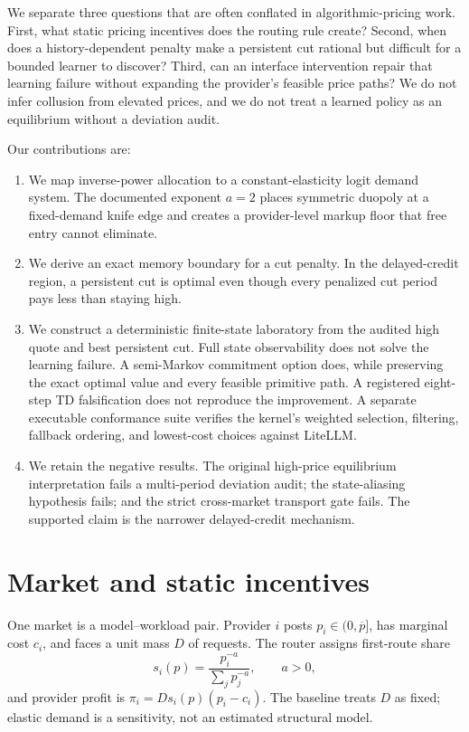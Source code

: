 \documentclass[11pt]{article}
\newcommand{\1}{\mathbf{1}}
\newcommand{\pbar}{\overline p}
\begin{document}
We separate three questions that are often conflated in algorithmic-pricing
work.  First, what static pricing incentives does the routing rule create?
Second, when does a history-dependent penalty make a persistent cut rational
but difficult for a bounded learner to discover?  Third, can an interface
intervention repair that learning failure without expanding the provider's
feasible price paths?  We do not infer collusion from elevated prices, and we
do not treat a learned policy as an equilibrium without a deviation audit.

Our contributions are:
\begin{enumerate}
  \item We map inverse-power allocation to a constant-elasticity logit demand
  system.  The documented exponent $a=2$ places symmetric duopoly at a
  fixed-demand knife edge and creates a provider-level markup floor that free
  entry cannot eliminate.
  \item We derive an exact memory boundary for a cut penalty.  In the
  delayed-credit region, a persistent cut is optimal even though every
  penalized cut period pays less than staying high.
  \item We construct a deterministic finite-state laboratory from the audited
  high quote and best persistent cut.  Full state observability does not solve
  the learning failure.  A semi-Markov commitment option does, while preserving
  the exact optimal value and every feasible primitive path.  A registered
  eight-step TD falsification does not reproduce the improvement.  A separate
  executable conformance suite verifies the kernel's weighted selection,
  filtering, fallback ordering, and lowest-cost choices against LiteLLM.
  \item We retain the negative results.  The original high-price equilibrium
  interpretation fails a multi-period deviation audit; the state-aliasing
  hypothesis fails; and the strict cross-market transport gate fails.  The
  supported claim is the narrower delayed-credit mechanism.
\end{enumerate}

\section{Market and static incentives}

One market is a model--workload pair.  Provider $i$ posts
$p_i\in(0,\pbar]$, has marginal cost $c_i$, and faces a unit mass $D$ of
requests.  The router assigns first-route share
\begin{equation}
  s_i(p)=\frac{p_i^{-a}}{\sum_j p_j^{-a}},\qquad a>0,
  \label{eq:share}
\end{equation}
and provider profit is $\pi_i=D s_i(p)(p_i-c_i)$.  The baseline treats $D$ as
fixed; elastic demand is a sensitivity, not an estimated structural model.
\end{document}
